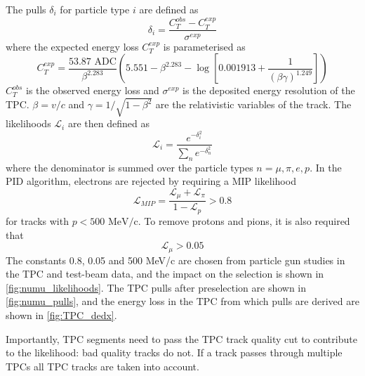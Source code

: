 \begin{itemize}
	The pulls $\delta_i$ for particle type $i$ are defined as
	\begin{equation}
	\label{eq:tpc_track_chi2}
	\delta_i = \frac{C_T^{obs}-C_T^{exp}}{\sigma^{exp}}
	\end{equation}
	where the expected energy loss $C_T^{exp}$ is parameterised as
	\begin{equation}
	C_T^{exp} = \frac{53.87 \text{ ADC}}{\beta^{2.283}} \left( 5.551 - \beta^{2.283} - \log\left[0.001913 + \frac{1}{\left(\beta\gamma\right)^{1.249}}\right]\right)
	\end{equation}
	$C_T^{obs}$ is the observed energy loss and $\sigma^{exp}$ is the deposited energy resolution of the TPC. $\beta=v/c$ and $\gamma = 1/\sqrt{1-\beta^2}$ are the relativistic variables of the track. The likelihoods $\mathcal{L}_i$ are then defined as
	\begin{equation}
	\label{eq:tpc_track_likelihood}
		\mathcal{L}_i = \frac{e^{-\delta^2_i}}{\sum_n e^{-\delta^2_n}}
	\end{equation}
	where the denominator is summed over the particle types $n=\mu,\pi,e,p$. In the PID algorithm, electrons are rejected by requiring a MIP likelihood
	\begin{equation}
		\label{eq:tpc_track_mip}
		\mathcal{L}_{MIP} = \frac{\mathcal{L}_\mu + \mathcal{L}_\pi}{1-\mathcal{L}_p} > 0.8
	\end{equation}
	for tracks with $p<500\text{ MeV/c}$. To remove protons and pions, it is also required that
	\begin{equation}
	\label{eq:tpc_track_mu}
		\mathcal{L}_\mu > 0.05
	\end{equation}
	The constants 0.8, 0.05 and 500 MeV/c are chosen from particle gun studies in the TPC and test-beam data\cite{t2k_tpc,thesis_tpc, thesis_christine}, and the impact on the selection is shown in \autoref{fig:numu_likelihoods}. The TPC pulls after preselection are shown in \autoref{fig:numu_pulls}, and the energy loss in the TPC from which pulls are derived are shown in \autoref{fig:TPC_dedx}.
	
	Importantly, TPC segments need to pass the TPC track quality cut to contribute to the likelihood: bad quality tracks do not. If a track passes through multiple TPCs all TPC tracks are taken into account.
\end{itemize}

